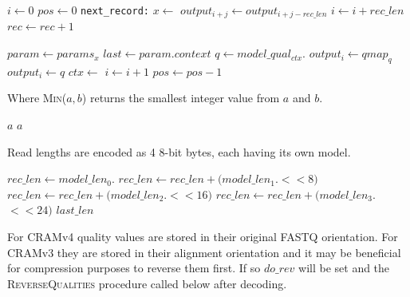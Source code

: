 \documentclass[a4paper]{article}
\begin{document}
\begin{algorithmic}[1]
  \State $i \gets 0$
  \State $pos \gets 0$
  \Label \texttt{next\_record:}
      \State $x \gets $
          \State $output_{i+j} \gets output_{i+j-rec\_len}$
        \EndFor
        \State $i \gets i+rec\_len$
        \State $rec \gets rec+1$
        \State {}
      \EndIf

      \Statex
      \State $param \gets params_x$
      \State $last \gets param.context$
    \EndIf
    \Statex
    \State $q \gets model\_qual_{ctx}.$
      \State $output_i \gets qmap_q$
    \Else
      \State $output_i \gets q$
    \EndIf
    \Statex
    \State $ctx \gets $
    \Statex
    \State $i \gets i + 1$
    \State $pos \gets pos - 1$
  \EndWhile
    \State {}
  \EndIf
\EndProcedure
\end{algorithmic}

Where \textsc{Min}($a,b$) returns the smallest integer value from $a$ and $b$.

\begin{algorithmic}[1]
    \State \Return $a$
  \Else
    \State \Return $a$
  \EndIf
  \EndFunction
\end{algorithmic}

Read lengths are encoded as 4 8-bit bytes, each having its own model.

\begin{algorithmic}[1]
\State $rec\_len \gets model\_len_0.$
\State $rec\_len \gets rec\_len + (model\_len_1.$$ << 8)$
\State $rec\_len \gets rec\_len + (model\_len_2.$$ << 16)$
\State $rec\_len \gets rec\_len + (model\_len_3.$$ << 24)$
\State \Return $last\_len$
\EndFunction
\end{algorithmic}

For CRAMv4 quality values are stored in their original FASTQ
orientation.  For CRAMv3 they are stored in their alignment
orientation and it may be beneficial for compression purposes to
reverse them first.  If so $do\_rev$ will be set and the
\textsc{ReverseQualities} procedure called below after decoding.
\end{document}
